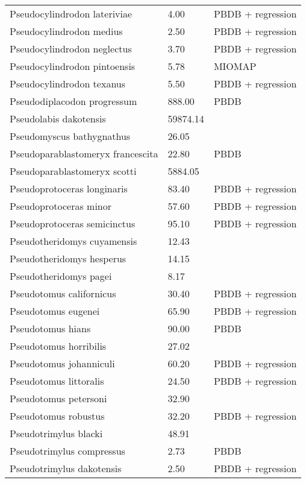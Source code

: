 \begin{longtable}{p{} p{} p{}}
    Pseudocylindrodon lateriviae & 4.00 & PBDB + regression \\ 
    Pseudocylindrodon medius & 2.50 & PBDB + regression \\ 
    Pseudocylindrodon neglectus & 3.70 & PBDB + regression \\ 
    Pseudocylindrodon pintoensis & 5.78 & MIOMAP \\ 
    Pseudocylindrodon texanus & 5.50 & PBDB + regression \\ 
    Pseudodiplacodon progressum & 888.00 & PBDB \\ 
    Pseudolabis dakotensis & 59874.14 & \cite{Tomiya2013} \\ 
    Pseudomyscus bathygnathus & 26.05 & \cite{Tomiya2013} \\ 
    Pseudoparablastomeryx francescita & 22.80 & PBDB \\ 
    Pseudoparablastomeryx scotti & 5884.05 & \cite{Tomiya2013} \\ 
    Pseudoprotoceras longinaris & 83.40 & PBDB + regression \\ 
    Pseudoprotoceras minor & 57.60 & PBDB + regression \\ 
    Pseudoprotoceras semicinctus & 95.10 & PBDB + regression \\ 
    Pseudotheridomys cuyamensis & 12.43 & \cite{Tomiya2013} \\ 
    Pseudotheridomys hesperus & 14.15 & \cite{Tomiya2013} \\ 
    Pseudotheridomys pagei & 8.17 & \cite{Tomiya2013} \\ 
    Pseudotomus californicus & 30.40 & PBDB + regression \\ 
    Pseudotomus eugenei & 65.90 & PBDB + regression \\ 
    Pseudotomus hians & 90.00 & PBDB \\ 
    Pseudotomus horribilis & 27.02 & \cite{Carraway2010} \\ 
    Pseudotomus johanniculi & 60.20 & PBDB + regression \\ 
    Pseudotomus littoralis & 24.50 & PBDB + regression \\ 
    Pseudotomus petersoni & 32.90 & \cite{Carraway2010} \\ 
    Pseudotomus robustus & 32.20 & PBDB + regression \\ 
    Pseudotrimylus blacki & 48.91 & \cite{Tomiya2013} \\ 
    Pseudotrimylus compressus & 2.73 & PBDB \\ 
    Pseudotrimylus dakotensis & 2.50 & PBDB + regression \\ 

\end{longtable}
